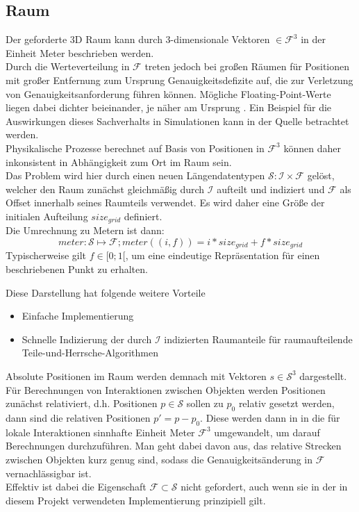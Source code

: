 \subsection{Raum}
\label{sec:space}
Der geforderte 3D Raum kann durch 3-dimensionale Vektoren $\in \mathcal{F}^3$ in der Einheit Meter beschrieben werden.\\
Durch die Werteverteilung in $\mathcal{F}$ treten jedoch bei großen Räumen für Positionen mit großer Entfernung zum Ursprung Genauigkeitsdefizite auf, die zur Verletzung von Genauigkeitsanforderung führen können. Mögliche Floating-Point-Werte liegen dabei dichter beieinander, je näher am Ursprung \cite{floatdistribution}. Ein Beispiel für die Auswirkungen dieses Sachverhalts in Simulationen kann in der Quelle \cite{floatdistributionexample} betrachtet werden.\\
Physikalische Prozesse berechnet auf Basis von Positionen in $\mathcal{F}^3$ können daher inkonsistent in Abhängigkeit zum Ort im Raum sein.\\
Das Problem wird hier durch einen neuen Längendatentypen $\mathcal{S} : \mathcal{I} \times \mathcal{F}$ gelöst, welcher den Raum zunächst gleichmäßig durch $\mathcal{I}$ aufteilt und indiziert und $\mathcal{F}$ als Offset innerhalb seines Raumteils verwendet. Es wird daher eine Größe der initialen Aufteilung $size_{grid}$ definiert.\\
Die Umrechnung zu Metern ist dann: $$ meter: \mathcal{S} \mapsto \mathcal{F};  meter((i, f)) = i * size_{grid} + f * size_{grid}$$ 
Typischerweise gilt $f \in [0;1[$, um eine eindeutige Repräsentation für einen beschriebenen Punkt zu erhalten.

Diese Darstellung hat folgende weitere Vorteile
\begin{itemize}
\item Einfache Implementierung
\item Schnelle Indizierung der durch $\mathcal{I}$ indizierten Raumanteile für raumaufteilende Teile-und-Herrsche-Algorithmen
\end{itemize}

Absolute Positionen im Raum werden demnach mit Vektoren $s\in\mathcal{S}^3$ dargestellt. Für Berechnungen von Interaktionen zwischen Objekten werden Positionen zunächst relativiert, d.h. Positionen $p \in \mathcal{S}$ sollen zu $p_0$ relativ gesetzt werden, dann sind die relativen Positionen $p' = p - p_0$. Diese werden dann in in die für lokale Interaktionen sinnhafte  Einheit Meter $\mathcal{F}^3$ umgewandelt, um darauf Berechnungen durchzuführen. Man geht dabei davon aus, das relative Strecken zwischen Objekten kurz genug sind, sodass die Genauigkeitsänderung in $\mathcal{F}$ vernachlässigbar ist.\\
Effektiv ist dabei die Eigenschaft $\mathcal{F}\subset\mathcal{S}$ nicht gefordert, auch wenn sie in der in diesem Projekt verwendeten Implementierung prinzipiell gilt.

